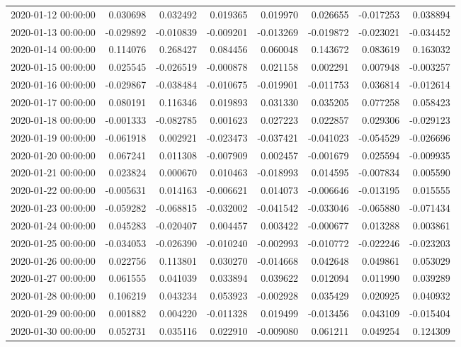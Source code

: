\begin{tabular}{lrrrrrrr}
2020-01-12 00:00:00 & 0.030698 & 0.032492 & 0.019365 & 0.019970 & 0.026655 & -0.017253 & 0.038894 \\
2020-01-13 00:00:00 & -0.029892 & -0.010839 & -0.009201 & -0.013269 & -0.019872 & -0.023021 & -0.034452 \\
2020-01-14 00:00:00 & 0.114076 & 0.268427 & 0.084456 & 0.060048 & 0.143672 & 0.083619 & 0.163032 \\
2020-01-15 00:00:00 & 0.025545 & -0.026519 & -0.000878 & 0.021158 & 0.002291 & 0.007948 & -0.003257 \\
2020-01-16 00:00:00 & -0.029867 & -0.038484 & -0.010675 & -0.019901 & -0.011753 & 0.036814 & -0.012614 \\
2020-01-17 00:00:00 & 0.080191 & 0.116346 & 0.019893 & 0.031330 & 0.035205 & 0.077258 & 0.058423 \\
2020-01-18 00:00:00 & -0.001333 & -0.082785 & 0.001623 & 0.027223 & 0.022857 & 0.029306 & -0.029123 \\
2020-01-19 00:00:00 & -0.061918 & 0.002921 & -0.023473 & -0.037421 & -0.041023 & -0.054529 & -0.026696 \\
2020-01-20 00:00:00 & 0.067241 & 0.011308 & -0.007909 & 0.002457 & -0.001679 & 0.025594 & -0.009935 \\
2020-01-21 00:00:00 & 0.023824 & 0.000670 & 0.010463 & -0.018993 & 0.014595 & -0.007834 & 0.005590 \\
2020-01-22 00:00:00 & -0.005631 & 0.014163 & -0.006621 & 0.014073 & -0.006646 & -0.013195 & 0.015555 \\
2020-01-23 00:00:00 & -0.059282 & -0.068815 & -0.032002 & -0.041542 & -0.033046 & -0.065880 & -0.071434 \\
2020-01-24 00:00:00 & 0.045283 & -0.020407 & 0.004457 & 0.003422 & -0.000677 & 0.013288 & 0.003861 \\
2020-01-25 00:00:00 & -0.034053 & -0.026390 & -0.010240 & -0.002993 & -0.010772 & -0.022246 & -0.023203 \\
2020-01-26 00:00:00 & 0.022756 & 0.113801 & 0.030270 & -0.014668 & 0.042648 & 0.049861 & 0.053029 \\
2020-01-27 00:00:00 & 0.061555 & 0.041039 & 0.033894 & 0.039622 & 0.012094 & 0.011990 & 0.039289 \\
2020-01-28 00:00:00 & 0.106219 & 0.043234 & 0.053923 & -0.002928 & 0.035429 & 0.020925 & 0.040932 \\
2020-01-29 00:00:00 & 0.001882 & 0.004220 & -0.011328 & 0.019499 & -0.013456 & 0.043109 & -0.015404 \\
2020-01-30 00:00:00 & 0.052731 & 0.035116 & 0.022910 & -0.009080 & 0.061211 & 0.049254 & 0.124309 \\

\end{tabular}
